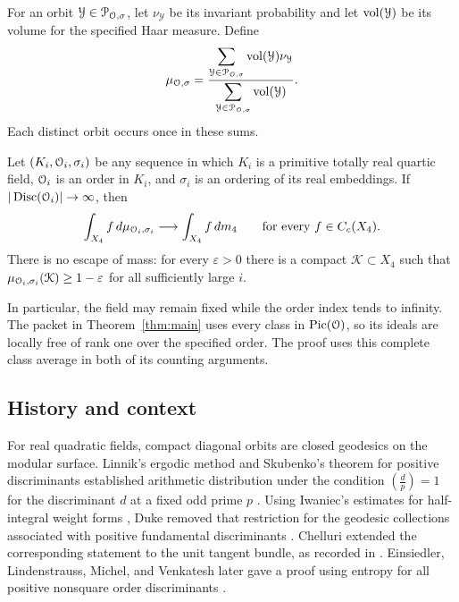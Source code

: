 For an orbit $\mathcal Y\in\mathcal P_{\mathcal O,\sigma}$, let $\nu_{\mathcal Y}$
be its invariant probability and let $\operatorname{vol}(\mathcal Y)$ be its volume for
the specified Haar measure.  Define
\begin{equation}\label{eq:intro-measure}
 \mu_{\mathcal O,\sigma}
 =\frac{\displaystyle\sum_{\mathcal Y\in\mathcal P_{\mathcal O,\sigma}}
              \operatorname{vol}(\mathcal Y)\nu_{\mathcal Y}}
        {\displaystyle\sum_{\mathcal Y\in\mathcal P_{\mathcal O,\sigma}}
              \operatorname{vol}(\mathcal Y)}.
\end{equation}
Each distinct orbit occurs once in these sums.

\begin{theorem}\label{thm:main}
Let $(K_i,\mathcal O_i,\sigma_i)$ be any sequence in which $K_i$ is a primitive
totally real quartic field, $\mathcal O_i$ is an order in $K_i$, and $\sigma_i$ is
an ordering of its real embeddings.  If $|\operatorname{Disc}(\mathcal O_i)|\to\infty$, then
\[
 \int_{X_4} f\,d\mu_{\mathcal O_i,\sigma_i}
       \longrightarrow \int_{X_4} f\,dm_4
       \qquad\text{for every }f\in C_c(X_4).
\]
There is no escape of mass: for every $\varepsilon>0$ there is a compact
$\mathcal K\subset X_4$ such that
$\mu_{\mathcal O_i,\sigma_i}(\mathcal K)\ge1-\varepsilon$ for all sufficiently
large $i$.
\end{theorem}

In particular, the field may remain fixed while the order index tends to
infinity.  The packet in Theorem~\ref{thm:main} uses every class in
$\operatorname{Pic}(\mathcal O)$, so its ideals are locally free of rank one over the specified
order.  The proof uses this complete class average in both of its counting
arguments.

\subsection{History and context}

For real quadratic fields, compact diagonal orbits are closed geodesics on
the modular surface.  Linnik's ergodic method and Skubenko's theorem for
positive discriminants established arithmetic distribution under the
condition $\left(\frac d p\right)=1$ for the discriminant $d$ at a fixed
odd prime $p$ \cite{Linnik1968,Skubenko1962}.
Using Iwaniec's estimates for half-integral weight forms \cite{Iwaniec1987},
Duke removed that restriction for the geodesic collections associated with
positive fundamental discriminants \cite[Theorem~1]{Duke1988}.
Chelluri extended the corresponding statement to the unit tangent bundle,
as recorded in \cite[Section~1.2, p.~253]{ELMV2012}.
Einsiedler, Lindenstrauss, Michel, and Venkatesh later gave a proof using
entropy for all positive nonsquare order discriminants
\cite[Theorem~2.3]{ELMV2012}.

